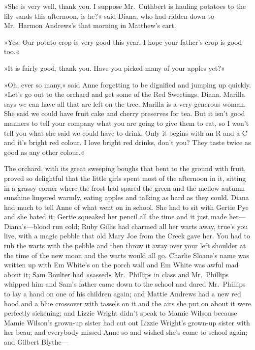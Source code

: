 »She is very well, thank you. I suppose Mr.~Cuthbert is hauling potatoes to the lily sands this afternoon, is he?« said Diana, who had ridden down to Mr.~Harmon Andrews's that morning in Matthew's cart.

»Yes. Our potato crop is very good this year. I hope your father's crop is good too.«

»It is fairly good, thank you. Have you picked many of your apples yet?«

»Oh, ever so many,« said Anne forgetting to be dignified and jumping up quickly. »Let's go out to the orchard and get some of the Red Sweetings, Diana. Marilla says we can have all that are left on the tree. Marilla is a very generous woman. She said we could have fruit cake and cherry preserves for tea. But it isn't good manners to tell your company what you are going to give them to eat, so I won't tell you what she said we could have to drink. Only it begins with an R and a C and it's bright red colour. I love bright red drinks, don't you? They taste twice as good as any other colour.«

The orchard, with its great sweeping boughs that bent to the ground with fruit, proved so delightful that the little girls spent most of the afternoon in it, sitting in a grassy corner where the frost had spared the green and the mellow autumn sunshine lingered warmly, eating apples and talking as hard as they could. Diana had much to tell Anne of what went on in school. She had to sit with Gertie Pye and she hated it; Gertie squeaked her pencil all the time and it just made her—Diana's—blood run cold; Ruby Gillis had charmed all her warts away, true's you live, with a magic pebble that old Mary Joe from the Creek gave her. You had to rub the warts with the pebble and then throw it away over your left shoulder at the time of the new moon and the warts would all go. Charlie Sloane's name was written up with Em White's on the porch wall and Em White was awful mad about it; Sam Boulter had »sassed« Mr.~Phillips in class and Mr.~Phillips whipped him and Sam's father came down to the school and dared Mr.~Phillips to lay a hand on one of his children again; and Mattie Andrews had a new red hood and a blue crossover with tassels on it and the airs she put on about it were perfectly sickening; and Lizzie Wright didn't speak to Mamie Wilson because Mamie Wilson's grown-up sister had cut out Lizzie Wright's grown-up sister with her beau; and everybody missed Anne so and wished she's come to school again; and Gilbert Blythe—

